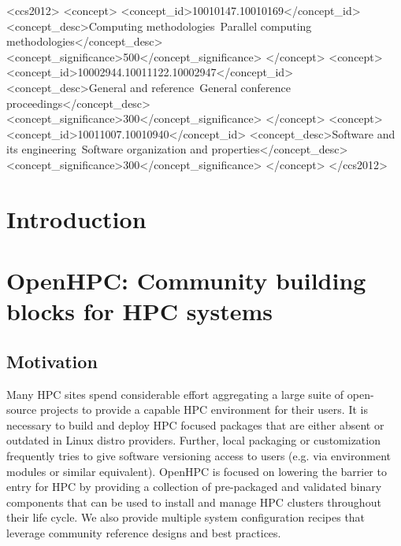 \documentclass{sig-alternate-05-2015}
\begin{document}
%
%
\begin{CCSXML}
<ccs2012>
<concept>
<concept_id>10010147.10010169</concept_id>
<concept_desc>Computing methodologies~Parallel computing
methodologies</concept_desc>
<concept_significance>500</concept_significance>
</concept>
<concept>
<concept_id>10002944.10011122.10002947</concept_id>
<concept_desc>General and reference~General conference
proceedings</concept_desc>
<concept_significance>300</concept_significance>
</concept>
<concept>
<concept_id>10011007.10010940</concept_id>
<concept_desc>Software and its engineering~Software organization and properties</concept_desc>
<concept_significance>300</concept_significance>
</concept>
</ccs2012>
\end{CCSXML}



%
%

%
%
\printccsdesc



\section{Introduction}

\section{OpenHPC: Community building blocks for HPC systems}

\subsection{Motivation}
Many HPC sites spend considerable effort aggregating a large suite of 
open-source projects to provide a capable HPC environment for their users.
It is necessary to build and deploy HPC focused packages that are either absent
or outdated in Linux distro providers. Further, local packaging or 
customization frequently tries to give software versioning access to users (e.g.
via environment modules or similar equivalent). OpenHPC is focused on 
lowering the barrier to entry for HPC by providing a collection of 
pre-packaged and validated binary components that can be used to install 
and manage HPC clusters throughout their life cycle. We also provide multiple 
system configuration recipes that leverage community reference designs and best 
practices. 
\end{document}
